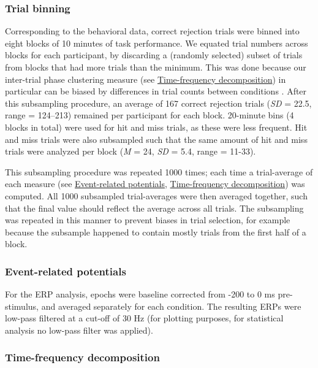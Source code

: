 \documentclass[11pt,]{memoir}
\begin{document}
\hypertarget{trial-binning}{%
\subsubsection{Trial binning}\label{trial-binning}}

Corresponding to the behavioral data, correct rejection trials were binned into eight blocks of 10 minutes of task performance. We equated trial numbers across blocks for each participant, by discarding a (randomly selected) subset of trials from blocks that had more trials than the minimum. This was done because our inter-trial phase clustering measure (see \protect\hyperlink{time-frequency-decomposition}{Time-frequency decomposition}) in particular can be biased by differences in trial counts between conditions \autocite{Cohen2014}. After this subsampling procedure, an average of 167 correct rejection trials (\emph{SD} = 22.5, range = 124--213) remained per participant for each block. 20-minute bins (4 blocks in total) were used for hit and miss trials, as these were less frequent. Hit and miss trials were also subsampled such that the same amount of hit and miss trials were analyzed per block (\emph{M} = 24, \emph{SD} = 5.4, range = 11-33).

This subsampling procedure was repeated 1000 times; each time a trial-average of each measure (see \protect\hyperlink{event-related-potentials}{Event-related potentials}, \protect\hyperlink{time-frequency-decomposition}{Time-frequency decomposition}) was computed. All 1000 subsampled trial-averages were then averaged together, such that the final value should reflect the average across all trials. The subsampling was repeated in this manner to prevent biases in trial selection, for example because the subsample happened to contain mostly trials from the first half of a block.

\hypertarget{event-related-potentials}{%
\subsubsection{Event-related potentials}\label{event-related-potentials}}

For the ERP analysis, epochs were baseline corrected from -200 to 0 ms pre-stimulus, and averaged separately for each condition. The resulting ERPs were low-pass filtered at a cut-off of 30 Hz (for plotting purposes, for statistical analysis no low-pass filter was applied).

\hypertarget{time-frequency-decomposition}{%
\subsubsection{Time-frequency decomposition}\label{time-frequency-decomposition}}
\end{document}
